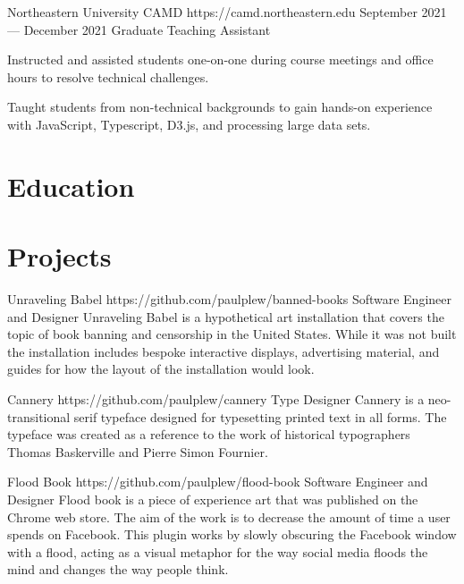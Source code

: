\documentclass{resume}
\begin{document}
\employer
    {Northeastern University CAMD}
    {https://camd.northeastern.edu}
    {September 2021--- December 2021}
    {Graduate Teaching Assistant}
    {\begin{jobitems}
        \item Instructed and assisted students one-on-one during course meetings and office hours to resolve technical challenges.
        \item Taught students from non-technical backgrounds to gain hands-on experience with JavaScript, Typescript, D3.js, and processing large data sets.
    \end{jobitems}}

\section{Education}


\section{Projects}
\project
    {Unraveling Babel}
    {https://github.com/paulplew/banned-books}
    {Software Engineer and Designer}
    {Unraveling Babel is a hypothetical art installation that covers the topic of book banning
    and censorship in the United States. While it was not built the installation includes
    bespoke interactive displays, advertising material, and guides for how the layout
    of the installation would look.}

\project
    {Cannery}
    {https://github.com/paulplew/cannery}
    {Type Designer}
    {Cannery is a neo-transitional serif typeface designed for typesetting printed text
    in all forms. The typeface was created as a reference to the work of historical 
    typographers Thomas Baskerville and Pierre Simon Fournier.}

\project
    {Flood Book}
    {https://github.com/paulplew/flood-book}
    {Software Engineer and Designer}
    {Flood book is a piece of experience art that was published on the Chrome web store.
    The aim of the work is to decrease the amount of time a user spends on Facebook. This plugin works by 
    slowly obscuring the Facebook window with a flood, acting as a visual metaphor
    for the way social media floods the mind and changes the way people think.}
\end{document}
